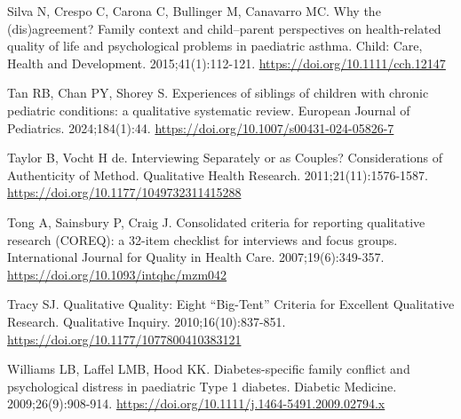 \documentclass[
  turkish,
  a4paper,
  DIV=11,
  numbers=noendperiod]{scrreprt}
\newlength{\cslhangindent}
\newenvironment{CSLReferences}[2] %
 {\begin{list}{}{%
  \setlength{\itemindent}{0pt}
  \setlength{\leftmargin}{0pt}
  \setlength{\parsep}{0pt}
  \ifodd #1
   \setlength{\leftmargin}{\cslhangindent}
   \setlength{\itemindent}{-1\cslhangindent}
  \fi
  \setlength{\itemsep}{#2\baselineskip}}}
 {\end{list}}
\begin{document}
\begin{CSLReferences}{1}{0}
Silva N, Crespo C, Carona C, Bullinger M, Canavarro MC. Why the
(dis)agreement? Family context and child--parent perspectives on
health-related quality of life and psychological problems in paediatric
asthma. Child: Care, Health and Development. 2015;41(1):112-121.
\url{https://doi.org/10.1111/cch.12147}

Tan RB, Chan PY, Shorey S. Experiences of siblings of children with
chronic pediatric conditions: a qualitative systematic review. European
Journal of Pediatrics. 2024;184(1):44.
\url{https://doi.org/10.1007/s00431-024-05826-7}

Taylor B, Vocht H de. Interviewing Separately or as Couples?
Considerations of Authenticity of Method. Qualitative Health Research.
2011;21(11):1576-1587. \url{https://doi.org/10.1177/1049732311415288}

Tong A, Sainsbury P, Craig J. Consolidated criteria for reporting
qualitative research (COREQ): a 32-item checklist for interviews and
focus groups. International Journal for Quality in Health Care.
2007;19(6):349-357. \url{https://doi.org/10.1093/intqhc/mzm042}

Tracy SJ. Qualitative {Quality}: {Eight} {``{Big}-{Tent}''} {Criteria}
for {Excellent} {Qualitative} {Research}. Qualitative Inquiry.
2010;16(10):837-851. \url{https://doi.org/10.1177/1077800410383121}

Williams LB, Laffel LMB, Hood KK. Diabetes-specific family conflict and
psychological distress in paediatric Type 1 diabetes. Diabetic Medicine.
2009;26(9):908-914.
\url{https://doi.org/10.1111/j.1464-5491.2009.02794.x}

\end{CSLReferences}
\end{document}
